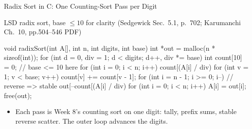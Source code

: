 \documentclass[aspectratio=169]{beamer}
\begin{document}
\begin{frame}[fragile]{Radix Sort in C: One Counting-Sort Pass per Digit}
  \footnotesize
  \begin{block}{LSD radix sort, base $\le 10$ for clarity (Sedgewick
    Sec.~5.1, p.~702; Karumanchi Ch.~10, pp.504--546 PDF)
    \cite{Sedgewick2011_algorithms,Karumanchi2017_data_structures_algorithms_made_easy}}
\begin{semiverbatim}
void radixSort(int A[], int n, int digits, int base) {
  int *out = malloc(n * sizeof(int));
  for (int d = 0, div = 1; d < digits; d++, div *= base) {
    int count[10] = {0};                 // base <= 10 here
    for (int i = 0; i < n; i++)
      count[(A[i] / div) %
    for (int v = 1; v < base; v++) count[v] += count[v - 1];
    for (int i = n - 1; i >= 0; i--)     // reverse => stable
      out[--count[(A[i] / div) %
    for (int i = 0; i < n; i++) A[i] = out[i];
  }
  free(out);
}
\end{semiverbatim}
  \end{block}
  \vspace{-0.4cm}
  \begin{itemize}
    \item Each pass is Week 8's counting sort on one digit: tally, prefix
      sums, stable reverse scatter. The outer loop advances the digits.
  \end{itemize}
\end{frame}
\end{document}
